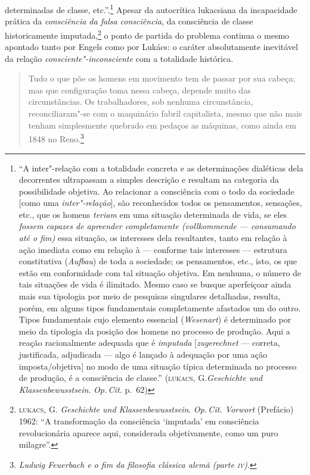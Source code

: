 determinadas de classe, etc.''.\footnote{``A inter"-relação com a
  totalidade concreta e as determinações dialéticas dela decorrentes
  ultrapassam a simples descrição e resultam na categoria da
  possibilidade objetiva. Ao relacionar a consciência com o todo da
  sociedade {[}como uma \emph{inter"-relação}{]}, são reconhecidos todos
  os pensamentos, sensações, etc., que os homens \emph{teriam} em uma
  situação determinada de vida, se eles \emph{fossem capazes de
  apreender completamente (vollkommende --- consumando até o fim)} essa
  situação, os interesses dela resultantes, tanto em relação à ação
  imediata como em relação à --- conforme tais interesses --- estrutura
  constitutiva (\emph{Aufbau}) de toda a sociedade; os pensamentos, etc.,
  isto, os que estão em conformidade com tal situação objetiva. Em
  nenhuma, o número de tais situações de vida é ilimitado. Mesmo caso se
  busque aperfeiçoar ainda mais sua tipologia por meio de pesquisas
  singulares detalhadas, resulta, porém, em alguns tipos fundamentais
  completamente afastados um do outro. Tipos fundamentais cujo elemento
  essencial (\emph{Wesenart}) é determinado por meio da tipologia da
  posição dos homens no processo de produção. Aqui a reação
  racionalmente adequada que é \emph{imputada}
  {[}\emph{zugerechnet} --- correta, justificada, adjudicada
  --- algo é lançado à adequação por uma ação
  imposta/objetiva{]} no modo de uma situação típica
  determinada no processo de produção, é a consciência de classe.''
  (\textsc{lukacs}, G.\emph{Geschichte und Klassenbewusstsein}.
  \emph{Op.\,Cit.} p.~62)} Apesar da autocrítica lukacsiana da
incapacidade prática da \emph{consciência da falsa consciência}, da
consciência de classe historicamente imputada,\footnote{\textsc{lukacs},
  G. \emph{Geschichte und Klassenbewusstsein}. \emph{Op.\,Cit. Vorwort}
  (Prefácio) 1962: ``A transformação da consciência `imputada' em
  consciência revolucionária aparece aqui, considerada objetivamente,
  como um puro milagre''.} o ponto de partida do problema continua o
mesmo apontado tanto por Engels como por Lukács: o caráter absolutamente
inevitável da relação \emph{consciente"-inconsciente} com a totalidade
histórica.

\begin{quote}
Tudo o que põe os homens em movimento tem de passar por sua cabeça; mas
que configuração toma nessa cabeça, depende muito das circunstâncias. Os
trabalhadores, sob nenhuma circunstância, reconciliaram"-se com o
maquinário fabril capitalista, mesmo que não mais tenham simplesmente
quebrado em pedaços as máquinas, como ainda em 1848 no Reno.\footnote{\emph{Ludwig Feuerbach e o fim da filosofia clássica alemã (parte \textsc{iv})}.}
\end{quote}

